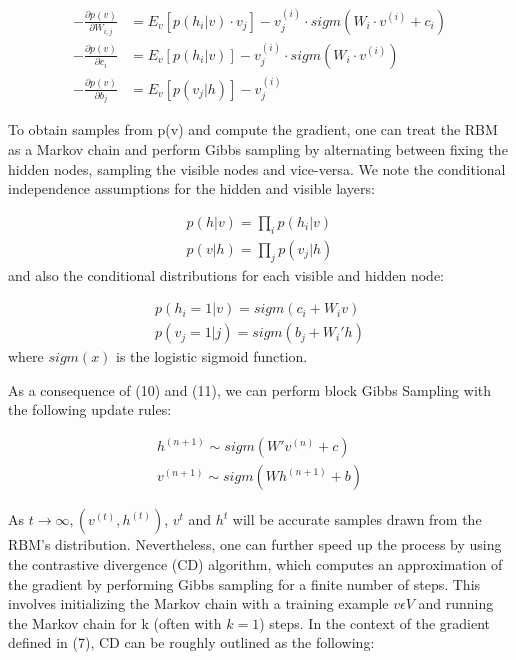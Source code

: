 \documentclass[journal]{IEEEtran}
\begin{document}
\begin{equation}
\begin{aligned}
- \frac{\partial p(v)}{\partial W_{i,j}} &= E_{v}[p(h_{i}|v)\cdot v_{j}] - v_{j}^{(i)}\cdot sigm(W_{i} \cdot v^{(i)} + c_{i})\\
- \frac{\partial p(v)}{\partial c_{i}} &= E_{v}[p(h_{i}|v)] - v_{j}^{(i)}\cdot sigm(W_{i} \cdot v^{(i)})\\
- \frac{\partial p(v)}{\partial b_{j}} &= E_{v}[p(v_{j}|h)] - v_{j}^{(i)}
\end{aligned}
\end{equation}

To obtain samples from p(v) and compute the gradient, one can treat the RBM as a Markov chain and perform Gibbs sampling by alternating between fixing the hidden nodes, sampling the visible nodes and vice-versa. We note the conditional independence assumptions for the hidden and visible layers:

\begin{equation}
\begin{aligned}
p(h|v) = \prod\limits_{i} p(h_{i}|v)\\
p(v|h) = \prod\limits_{j} p(v_{j}|h)
\end{aligned}
\end{equation} and also the conditional distributions for each visible and hidden node:

\begin{equation}
\begin{aligned}
p(h_{i} = 1|v) = sigm(c_{i} + W_{i}v)\\
p(v_{j} = 1|j) = sigm(b_{j} + W_{i}'h)
\end{aligned}
\end{equation} where $sigm(x)$ is the logistic sigmoid function.

As a consequence of (10) and (11), we can perform block Gibbs Sampling with the following update rules:

\begin{equation}
\begin{aligned}
h^{(n+1)} \sim sigm(W'v^{(n)} + c)\\
v^{(n+1)} \sim sigm(Wh^{(n+1)} + b)
\end{aligned}
\end{equation}

As $t \rightarrow \infty,  (v^{(t)},h^{(t)})$, $v^{t}$ and $h^{t}$ will be accurate samples drawn from the RBM's distribution. Nevertheless, one can further speed up the process by using the contrastive divergence (CD) algorithm, which computes an approximation of the gradient by performing Gibbs sampling for a finite number of steps. This involves initializing the Markov chain with a training example $v \epsilon V$ and running the Markov chain for k (often with $k = 1$) steps. In the context of the gradient defined in (7), CD can be roughly outlined as the following:
\end{document}
